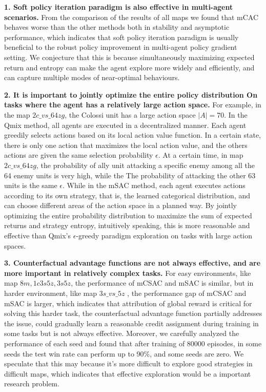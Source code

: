 \documentclass[runningheads]{llncs}
\begin{document}
{\bf 1. Soft policy iteration paradigm is also effective in multi-agent scenarios. }
From the comparison of the results of all maps we found that mCAC behaves worse than the other methods both in stability and asymptotic performance, which indicates that soft policy iteration paradigm is usually beneficial to the robust policy improvement in multi-agent policy gradient setting. We conjecture that this is because simultaneously maximizing expected return and entropy can make the agent explore more widely and efficiently, and can capture multiple modes of near-optimal behaviours. 


{\bf 2. It is important to jointly optimize the entire policy distribution On tasks where the agent has a relatively large action space. }
For example, in the map $2c\_vs\_64zg$, the Colossi unit has a large action space $|A|=70$. In the Qmix method, all agents are executed in a decentralized manner. Each agent greedily selects actions based on its local action value function. In a certain state, there is only one action that maximizes the local action value, and the others actions are given the same selection probability $\epsilon$. At a certain time, in map $2c\_vs\_64zg$, the probability of ally unit attacking a specific enemy among all the 64 enemy units is very high, while the The probability of attacking the other 63 units is the same $\epsilon$.
While in the mSAC method, each agent executes actions according to its own strategy, that is, the learned categorical distribution, and can choose different areas of the action space in a planned way.
By jointly optimizing the entire probability distribution to maximize the sum of expected returns and strategy entropy, intuitively speaking, this is more reasonable and effective than Qmix's $\epsilon$-greedy paradigm exploration on tasks with large action spaces.

{\bf 3. Counterfactual advantage functions are not always effective, and are more important in relatively complex tasks. }
For easy environments, like map $8m, 1c3s5z, 3s5z$, the performance of mCSAC and mSAC is similar, but in harder environment, like map $3s\_vs\_5z$ , the performance gap of mCSAC and mSAC is larger, which indicates that attribution of global reward is critical for solving this harder task, the counterfactual advantage function partially addresses the issue, could gradually learn a reasonable credit assignment during training in some tasks but is not always effective. Moreover, we carefully analyzed the performance of each seed and found that after training of 80000 episodes, in some seeds the test win rate can perform up to 90\%, and some seeds are zero. We speculate that this may because it's more difficult to explore good strategies in difficult maps, which indicates that effective exploration would be a important research problem.
\end{document}
